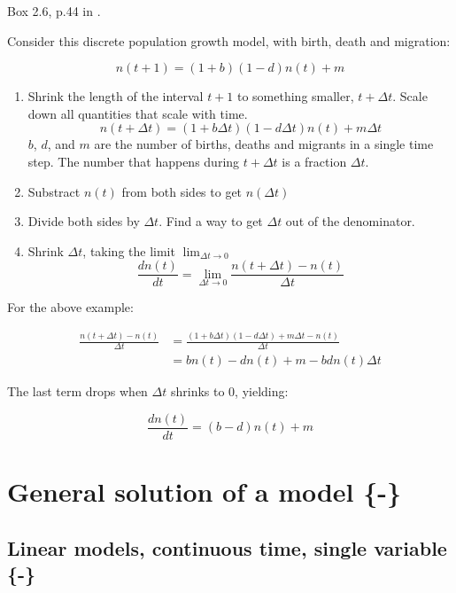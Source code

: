 \documentclass[
]{book}
\providecommand{\tightlist}{%
  \setlength{\itemsep}{0pt}\setlength{\parskip}{0pt}}
\theoremstyle{definition}
\theoremstyle{definition}
\theoremstyle{definition}
\theoremstyle{definition}
\theoremstyle{remark}
\begin{document}
Box 2.6, p.44 in \citet{otto_biologists_2007}.

Consider this discrete population growth model, with birth, death and migration:

\[
  n(t+1) = (1 + b)(1-d)n(t) + m
\]

\begin{enumerate}
\def\labelenumi{\arabic{enumi}.}
\tightlist
\item
  Shrink the length of the interval \(t+1\) to something smaller, \(t+\Delta t\).
  Scale down all quantities that scale with time.
  \[
    n(t+\Delta t) = (1 + b\Delta t)(1-d\Delta t)n(t) + m\Delta t
  \]
  \(b\), \(d\), and \(m\) are the number of births, deaths and migrants in a single
  time step. The number that happens during \(t+\Delta t\) is a fraction \(\Delta t\).
\item
  Substract \(n(t)\) from both sides to get \(n(\Delta t)\)
\item
  Divide both sides by \(\Delta t\). Find a way to get \(\Delta t\) out of the denominator.
\item
  Shrink \(\Delta t\), taking the limit \(\lim_{\Delta t\to 0}\)
  \[
    \frac{dn(t)}{dt} = \lim_{\Delta t \to 0} \frac{n(t + \Delta t) - n(t)}{\Delta t}
  \]
\end{enumerate}

For the above example:

\begin{align}
  \frac{n(t + \Delta t) - n(t)}{\Delta t} &= \frac{(1 + b\Delta t)(1 - d\Delta t) + m\Delta t - n(t)}{\Delta t} \\
  &= bn(t) - dn(t) + m -bdn(t)\Delta t
\end{align}

The last term drops when \(\Delta t\) shrinks to 0, yielding:

\[
  \frac{dn(t)}{dt} = (b - d)n(t) + m
\]

\hypertarget{sol}{%
\section{General solution of a model \{-\}}\label{sol}}

\hypertarget{sol-lin-cont-single}{%
\subsection{Linear models, continuous time, single variable \{-\}}\label{sol-lin-cont-single}}
\end{document}
